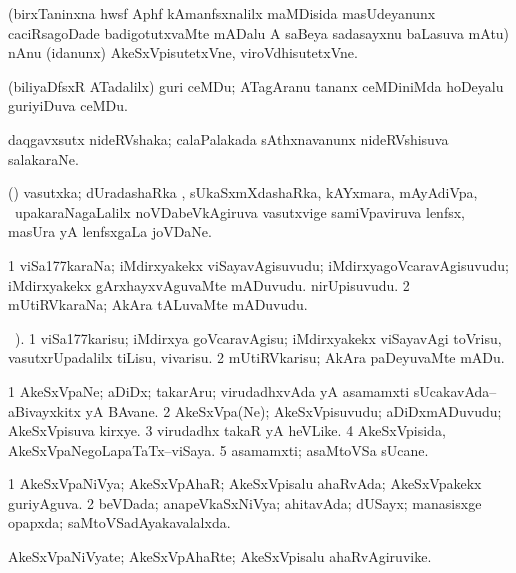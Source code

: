 \noindent
\gl{\pagu}
\bmng
{} (birxTaninxna hwsf Aphf kAmanfsxnalilx maMDisida masUdeyanunx caciRsagoDade badigotutxvaMte mADalu A saBeya sadasayxnu baLasuva mAtu) nAnu (idanunx) AkeSxVpisutetxVne, viroVdhisutetxVne. 
\emng
\eentry

\bentry
{}
\gl{\nA}
\bmng
(biliyaDfsxR ATadalilx) guri ceMDu; ATagAranu tananx ceMDiniMda hoDeyalu guriyiDuva ceMDu. 
\emng
\eentry

\bentry
{}
\gl{\nA}
\bmng
daqgavxsutx nideRVshaka; calaPalakada sAthxnavanunx nideRVshisuva salakaraNe. 
\emng
\eentry

\bentry
{}
\gl{\nA}
\bmng
(\daqvi) vasutxka; dUradashaRka , sUkaSxmXdashaRka, kAYxmara, mAyAdiVpa, \mo\ upakaraNagaLalilx noVDabeVkAgiruva vasutxvige samiVpaviruva lenfsx, masUra yA lenfsxgaLa joVDaNe. 
\emng
\eentry

\bentry
{}
\gl{\nA}
\bmng
\bnum
\num{1} viSa\char177karaNa; iMdirxyakekx viSayavAgisuvudu; iMdirxyagoVcaravAgisuvudu; iMdirxyakekx gArxhayxvAguvaMte mADuvudu. nirUpisuvudu. 
\num{2} mUtiRVkaraNa; AkAra tALuvaMte mADuvudu. 
\enum
\emng
\eentry

\bentry
{}
\gl{\sakirx}
\BUkaq\ ).\bmng
\bnum
\num{1} viSa\char177karisu; iMdirxya goVcaravAgisu; iMdirxyakekx viSayavAgi toVrisu, vasutxrUpadalilx tiLisu, vivarisu. 
\num{2} mUtiRVkarisu; AkAra paDeyuvaMte mADu. 
\enum
\emng
\eentry

\bentry
{}
\gl{\nA}
\bmng
\bnum
\num{1} AkeSxVpaNe; aDiDx; takarAru; virudadhxvAda yA asamamxti sUcakavAda--aBivayxkitx yA BAvane. 
\num{2} AkeSxVpa(Ne); AkeSxVpisuvudu; aDiDxmADuvudu; AkeSxVpisuva kirxye. 
\num{3} virudadhx takaR yA heVLike. 
\num{4} AkeSxVpisida, AkeSxVpaNegoLapaTaTx--viSaya. 
\num{5} asamamxti; asaMtoVSa sUcane. 
\enum
\emng
\eentry

\bentry
{}
\gl{\gu}
\bmng
\bnum
\num{1} AkeSxVpaNiVya; AkeSxVpAhaR; AkeSxVpisalu ahaRvAda; AkeSxVpakekx guriyAguva. 
\num{2} beVDada; anapeVkaSxNiVya; ahitavAda; dUSayx; manasisxge opapxda; saMtoVSadAyakavalalxda. 
\enum
\emng
\eentry

\bentry
{}
\gl{\nA}
\bmng
AkeSxVpaNiVyate; AkeSxVpAhaRte; AkeSxVpisalu ahaRvAgiruvike. 
\emng
\eentry

